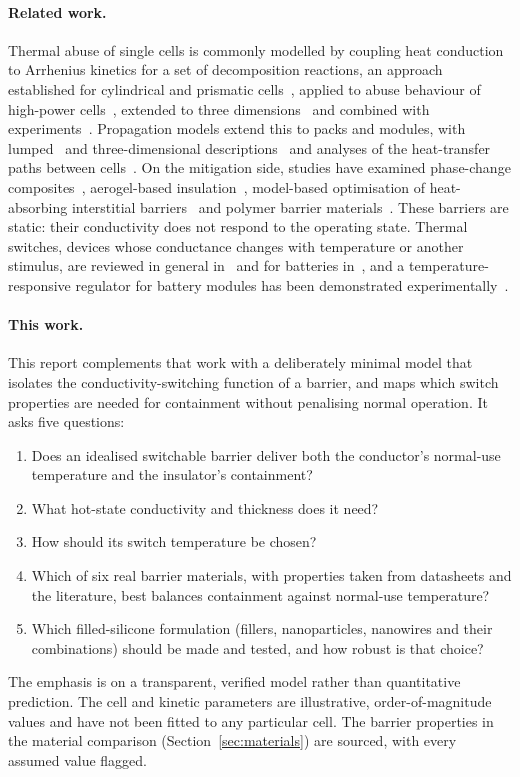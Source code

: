 \documentclass[11pt]{article}
\begin{document}
\paragraph{Related work.}
Thermal abuse of single cells is commonly modelled by coupling heat conduction to
Arrhenius kinetics for a set of decomposition reactions, an approach established for
cylindrical and prismatic cells~\cite{hatchard2001}, applied to abuse behaviour of
high-power cells~\cite{spotnitz2003}, extended to three dimensions~\cite{kim2007abuse}
and combined with experiments~\cite{lopez2015abuse}. Propagation models extend this to
packs and modules, with lumped~\cite{feng2015propagation} and three-dimensional
descriptions~\cite{feng2016module} and analyses of the heat-transfer paths between
cells~\cite{tang2020propagation}. On the mitigation side, studies have examined
phase-change composites~\cite{wilke2017pcm}, aerogel-based
insulation~\cite{wong2024aerogel}, model-based optimisation of heat-absorbing
interstitial barriers~\cite{menz2023barriers} and polymer barrier
materials~\cite{li2026polymer}. These barriers are static: their conductivity does not
respond to the operating state. Thermal switches, devices whose conductance changes with
temperature or another stimulus, are reviewed in general in~\cite{wehmeyer2017switches}
and for batteries in~\cite{li2025switches}, and a temperature-responsive regulator for
battery modules has been demonstrated experimentally~\cite{wang2024regulator}.

\paragraph{This work.}
This report complements that work with a deliberately minimal model that isolates the
conductivity-switching function of a barrier, and maps which switch properties are
needed for containment without penalising normal operation. It asks five questions:
\begin{enumerate}
  \item Does an idealised switchable barrier deliver both the conductor's normal-use
        temperature and the insulator's containment?
  \item What hot-state conductivity and thickness does it need?
  \item How should its switch temperature be chosen?
  \item Which of six real barrier materials, with properties taken from datasheets and
        the literature, best balances containment against normal-use temperature?
  \item Which filled-silicone formulation (fillers, nanoparticles, nanowires and their
        combinations) should be made and tested, and how robust is that choice?
\end{enumerate}
The emphasis is on a transparent, verified model rather than quantitative prediction.
The cell and kinetic parameters are illustrative, order-of-magnitude values and have
not been fitted to any particular cell. The barrier properties in the material comparison
(Section~\ref{sec:materials}) are sourced, with every assumed value flagged.
\end{document}
